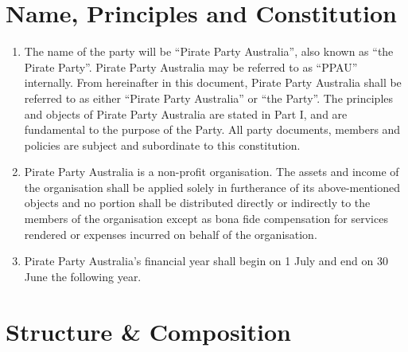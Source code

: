 \documentclass[a4paper,titlepage,8.5pt]{article}
\begin{document}
\section{Name, Principles and Constitution}

\begin{enumerate}
\item The name of the party will be ``Pirate Party Australia'', also known as ``the Pirate Party''. Pirate Party Australia may be referred to as ``PPAU'' internally. From hereinafter in this document, Pirate Party Australia shall be referred to as either ``Pirate Party Australia'' or ``the Party''. The principles and objects of Pirate Party Australia are stated in Part I, and are fundamental to the purpose of the Party. All party documents, members and policies are subject and subordinate to this constitution.
\item Pirate Party Australia is a non-profit organisation. The assets and income of the organisation shall be applied solely in furtherance of its above-mentioned objects and no portion shall be distributed directly or indirectly to the members of the organisation except as bona fide compensation for services rendered or expenses incurred on behalf of the organisation.
\item Pirate Party Australia's financial year shall begin on 1 July and end on 30 June the following year.
\end{enumerate}

\section{Structure \& Composition}
\end{document}
